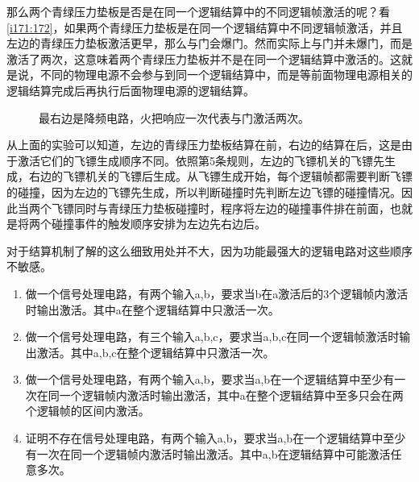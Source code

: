 那么两个青绿压力垫板是否是在同一个逻辑结算中的不同逻辑帧激活的呢？看\autoref{i171:172}，如果两个青绿压力垫板是在同一个逻辑结算中不同逻辑帧激活，并且左边的青绿压力垫板激活更早，那么与门会爆门。然而实际上与门并未爆门，而是激活了两次，这意味着两个青绿压力垫板并不是在同一个逻辑结算中激活的。这就是说，不同的物理电源不会参与到同一个逻辑结算中，而是等前面物理电源相关的逻辑结算完成后再执行后面物理电源的逻辑结算。

\begin{figure}[!ht]
\begin{center}
\qquad
{}
\end{center}
\caption{最右边是降频电路，火把响应一次代表与门激活两次。}
\label{i171:172}
\end{figure}

从上面的实验可以知道，左边的青绿压力垫板结算在前，右边的结算在后，这是由于激活它们的飞镖生成顺序不同。依照第5条规则，左边的飞镖机关的飞镖先生成，右边的飞镖机关的飞镖后生成。从飞镖生成开始，每个逻辑帧都需要判断飞镖的碰撞，因为左边的飞镖先生成，所以判断碰撞时先判断左边飞镖的碰撞情况。因此当两个飞镖同时与青绿压力垫板碰撞时，程序将左边的碰撞事件排在前面，也就是将两个碰撞事件的触发顺序安排为左边先右边后。

对于结算机制了解的这么细致用处并不大，因为功能最强大的逻辑电路对这些顺序不敏感。

\begin{enumerate}
\item 做一个信号处理电路，有两个输入a,b，要求当b在a激活后的3个逻辑帧内激活时输出激活。其中a在整个逻辑结算中只激活一次。
\item 做一个信号处理电路，有三个输入a,b,c，要求当a,b,c在同一个逻辑帧激活时输出激活。其中a,b,c在整个逻辑结算中只激活一次。
\item 做一个信号处理电路，有两个输入a,b，要求当a,b在一个逻辑结算中至少有一次在同一个逻辑帧内激活时输出激活，其中a在整个逻辑结算中至多只会在两个逻辑帧的区间内激活。
\item 证明不存在信号处理电路，有两个输入a,b，要求当a,b在一个逻辑结算中至少有一次在同一个逻辑帧内激活时输出激活。其中a,b在逻辑结算中可能激活任意多次。
\end{enumerate}